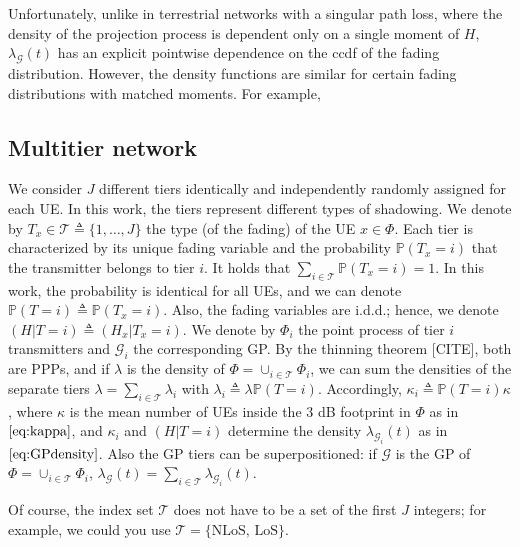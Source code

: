 \documentclass[conference]{IEEEtran}
\theoremstyle{definition}
\theoremstyle{plain}
\begin{document}
          Unfortunately, unlike in terrestrial networks with a singular path loss, where the density of the projection process is dependent only on a single moment of $H$, $\lambda_{\mathcal{G}}(t)$ has an explicit pointwise dependence on the ccdf of the fading distribution. However, the density functions are similar for certain fading distributions with matched moments. For example,

          \subsection{Multitier network}

          
          We consider $J$ different tiers identically and independently randomly assigned for each UE. In this work, the tiers represent different types of shadowing. We denote by $T_x \in \mathcal{T} \triangleq \{1,\dots, J\}$ the type (of the fading) of the UE $x \in \Phi $. Each tier is characterized by its unique fading variable and the probability $\mathbb{P}(T_x = i)$ that the transmitter belongs to tier $i$. It holds that $\sum_{i \in \mathcal{T}} \mathbb{P}(T_x = i) =1$. In this work, the probability is identical for all UEs, and we can denote $\mathbb{P}(T = i) \triangleq \mathbb{P}(T_x = i)$. Also, the fading variables are i.d.d.; hence, we denote $(H | T=i) \triangleq (H_x | T_x=i)$. We denote by $\Phi_i$ the point process of tier $i$ transmitters and $\mathcal{G}_i$ the corresponding GP. By the thinning theorem [CITE], both are PPPs, and if $\lambda$ is the density of $\Phi=\cup_{i \in \mathcal{T}} \Phi_i$, we can sum the densities of the separate tiers $\lambda = \sum_{i \in \mathcal{T}} \lambda_i$ with $\lambda_i \triangleq \lambda \mathbb{P}(T = i)$. Accordingly,  ${\kappa}_i \triangleq \mathbb{P}(T = i){\kappa}$, where $\kappa$ is the mean number of UEs inside the $3$ dB footprint in $\Phi$ as in $\eqref{eq:kappa}$, and $\kappa_i$ and $(H|T=i)$ determine the density $\lambda_{\mathcal{G}_i}(t)$ as in $\eqref{eq:GPdensity}$. Also the GP tiers can be superpositioned: if $\mathcal{G}$ is the GP of $\Phi=\cup_{i \in \mathcal{T}} \Phi_i$, $\lambda_{\mathcal{G}}(t)= \sum_{i \in \mathcal{T}}\lambda_{\mathcal{G}_i}(t)$. 

          Of course, the index set $\mathcal{T}$ does not have to be a set of the first $J$ integers; for example, we could you use $\mathcal{T}=\{\text{NLoS, LoS} \}$.
\end{document}

